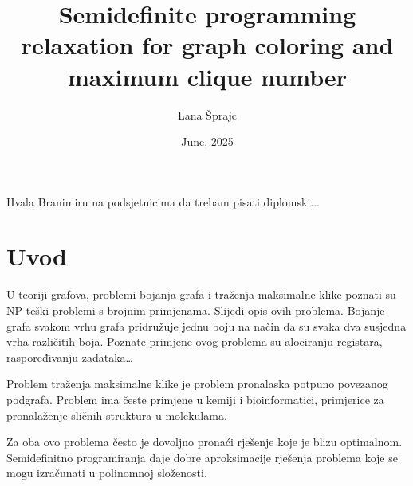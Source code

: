 \documentclass[diplomskirad]{fer}
\title{Semidefinite programming relaxation for graph coloring and maximum clique number}
\author{Lana Šprajc}
\date{June, 2025}
\begin{document}
\maketitle






\begin{zahvale}
  Hvala Branimiru na podsjetnicima da trebam pisati diplomski...
\end{zahvale}


\mainmatter


\tableofcontents


\chapter{Uvod}
\label{pog:uvod}

U teoriji grafova, problemi bojanja grafa i traženja maksimalne klike poznati su NP-teški problemi s brojnim primjenama. Slijedi opis
ovih problema. Bojanje grafa svakom vrhu grafa pridružuje jednu boju na način da su svaka dva susjedna vrha različitih boja. Poznate primjene ovog
problema su alociranju registara, raspoređivanju zadataka\dots  %

Problem traženja maksimalne klike je problem pronalaska potpuno povezanog podgrafa. Problem ima česte primjene u kemiji i bioinformatici,
primjerice za pronalaženje sličnih struktura u molekulama. %

Za oba ovo problema često je dovoljno pronaći rješenje koje je blizu optimalnom. Semidefinitno programiranja daje dobre aproksimacije rješenja problema
koje se mogu izračunati u polinomnoj složenosti.
\end{document}
